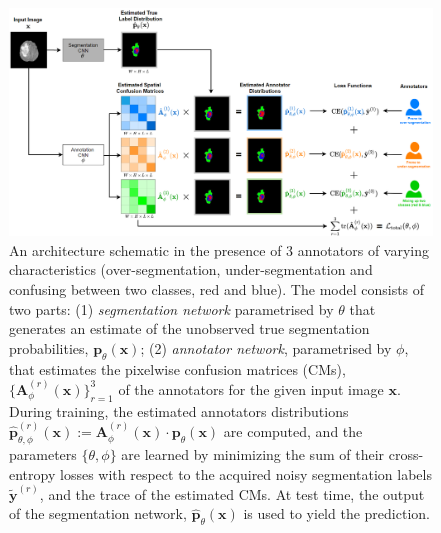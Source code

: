 \begin{figure}[t]
    \centering
    \vspace{-2mm}
    \includegraphics[width=\linewidth]{chapter_8_neurips/picture22.png}
    \caption{\footnotesize An architecture schematic in the presence of 3 annotators of varying characteristics (over-segmentation, under-segmentation and confusing between two classes, red and blue). The model consists of two parts: (1) \textit{segmentation network} parametrised by $\theta$ that generates an estimate of the unobserved true segmentation probabilities, $\textbf{p}_{\theta}(\textbf{x})$; (2) \textit{annotator network}, parametrised by $\phi$, that estimates the pixelwise confusion matrices (CMs), $\{\textbf{A}_{\phi}^{(r)}(\textbf{x})\}_{r=1}^{3}$ of the annotators  for the given input image $\textbf{x}$. During training, the estimated annotators distributions $\hat{\textbf{p}}_{\theta,\phi}^{(r)}(\textbf{x}):=\textbf{A}_{\phi}^{(r)}(\textbf{x})\cdot\textbf{p}_{\theta}(\textbf{x})$ are computed, and the parameters $\{\theta, \phi\}$ are learned by minimizing the sum of their cross-entropy losses with respect to the acquired noisy segmentation labels $\tilde{\mathbf{y}}^{(r)}$, and the trace of the estimated CMs. At test time, the output of the segmentation network, $\hat{\textbf{p}}_{\theta}(\textbf{x})$ is used to yield the prediction.}
    \label{picture 2}
\end{figure}


